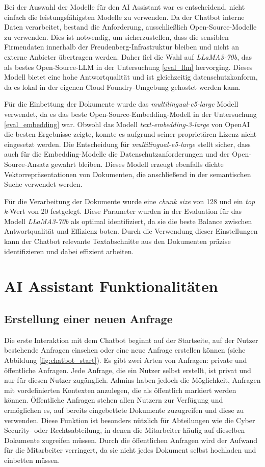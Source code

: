 Bei der Auswahl der Modelle für den AI Assistant war es entscheidend, nicht einfach die leistungsfähigsten Modelle zu verwenden. 
Da der Chatbot interne Daten verarbeitet, bestand die Anforderung, ausschließlich Open-Source-Modelle zu verwenden. Dies ist notwendig, um sicherzustellen, 
dass die sensiblen Firmendaten innerhalb der Freudenberg-Infrastruktur bleiben und nicht an externe Anbieter übertragen werden. 
Daher fiel die Wahl auf \textit{LLaMA3-70b}, das als bestes Open-Source-\ac{LLM} in der Untersuchung \ref{eval_llm} hervorging.
Dieses Modell bietet eine hohe Antwortqualität und ist gleichzeitig datenschutzkonform, da es lokal in der eigenen Cloud Foundry-Umgebung gehostet werden kann. 

Für die Einbettung der Dokumente wurde das \textit{multilingual-e5-large} Modell verwendet, da es das beste Open-Source-Embedding-Modell in der Untersuchung \ref{eval_embedding} war. 
Obwohl das Modell \textit{text-embedding-3-large} von OpenAI die besten Ergebnisse zeigte, konnte es aufgrund seiner proprietären Lizenz nicht eingesetzt werden. 
Die Entscheidung für \textit{multilingual-e5-large} stellt sicher, dass auch für die Embedding-Modelle die Datenschutzanforderungen und der Open-Source-Ansatz gewahrt bleiben. 
Dieses Modell erzeugt ebenfalls dichte Vektorrepräsentationen von Dokumenten, die anschließend in der semantischen Suche verwendet werden.

Für die Verarbeitung der Dokumente wurde eine \textit{chunk size} von 128 und ein \textit{top k}-Wert von 20 festgelegt. 
Diese Parameter wurden in der Evaluation für das Modell \textit{LLaMA3-70b} als optimal identifiziert, da sie die beste Balance zwischen Antwortqualität und Effizienz boten. 
Durch die Verwendung dieser Einstellungen kann der Chatbot relevante Textabschnitte aus den Dokumenten präzise identifizieren und dabei effizient arbeiten.

\section{AI Assistant Funktionalitäten}
\subsection{Erstellung einer neuen Anfrage}
Die erste Interaktion mit dem Chatbot beginnt auf der Startseite, auf der Nutzer bestehende Anfragen einsehen oder eine neue Anfrage erstellen können (siehe Abbildung \ref{fig:chatbot_start}). 
Es gibt zwei Arten von Anfragen: private und öffentliche Anfragen. Jede Anfrage, die ein Nutzer selbst erstellt, ist privat und nur für diesen Nutzer zugänglich. 
Admins haben jedoch die Möglichkeit, Anfragen mit vordefinierten Kontexten anzulegen, die als öffentlich markiert werden können. 
Öffentliche Anfragen stehen allen Nutzern zur Verfügung und ermöglichen es, auf bereits eingebettete Dokumente zuzugreifen und diese zu verwenden. 
Diese Funktion ist besonders nützlich für Abteilungen wie die Cyber Security- oder Rechtsabteilung, in denen die Mitarbeiter häufig auf dieselben Dokumente zugreifen müssen. 
Durch die öffentlichen Anfragen wird der Aufwand für die Mitarbeiter verringert, da sie nicht jedes Dokument selbst hochladen und einbetten müssen.

